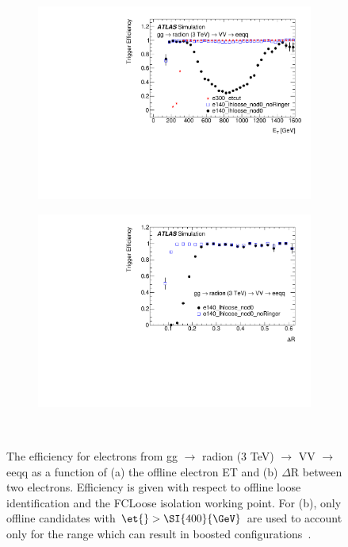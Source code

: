 \begin{figure}[h!tb]
\centering
\begin{subfigure}[c]{.48\textwidth}
\centering
\includegraphics[width=\textwidth]{sections/other_studies/figures/public_plots/fig_13a}
\caption{}%
\label{fig:boosted_eff_et}
\end{subfigure}
\hfill
\begin{subfigure}[c]{.48\textwidth}
\centering
\includegraphics[width=\textwidth]{sections/other_studies/figures/public_plots/fig_13b}
\caption{}%
\label{fig:boosted_eff_dr}
\end{subfigure} \\
\caption{
The efficiency for electrons from gg $\rightarrow$ radion (3 TeV)
$\rightarrow$ VV $\rightarrow$ eeqq as a function of (a) the offline electron ET
and (b) $\Delta$R between two electrons. Efficiency is given with respect to
offline loose identification and the FCLoose isolation working point. For (b),
only offline candidates with $\et{} > \SI{400}{\GeV}$ are used to account only
for the range which can result in boosted configurations~\cite{aad2020performance}.
}%
\end{figure}





